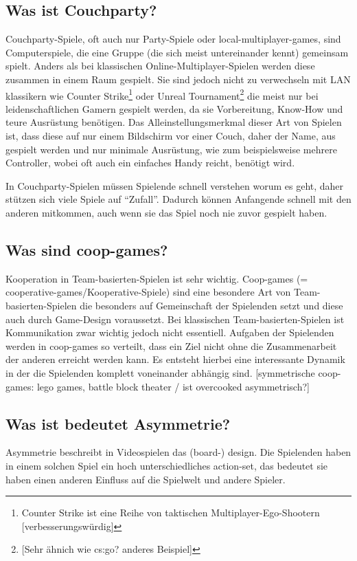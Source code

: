 \subsection{Was ist Couchparty?}

Couchparty-Spiele, oft auch nur Party-Spiele oder local-multiplayer-games, sind Computerspiele, die eine Gruppe (die sich meist untereinander kennt) gemeinsam spielt. Anders als bei klassischen Online-Multiplayer-Spielen werden diese zusammen in einem Raum gespielt. Sie sind jedoch nicht zu verwechseln mit LAN klassikern wie Counter Strike\footnote{Counter Strike ist eine Reihe von taktischen Multiplayer-Ego-Shootern [verbesserungswürdig]} oder Unreal Tournament\footnote{[Sehr ähnich wie cs:go? anderes Beispiel]} die meist nur bei leidenschaftlichen Gamern gespielt werden, da sie Vorbereitung, Know-How und teure Ausrüstung benötigen. Das Alleinstellungsmerkmal dieser Art von Spielen ist, dass diese auf nur einem Bildschirm vor einer Couch, daher der Name, aus gespielt werden und nur minimale Ausrüstung, wie zum beispielsweise mehrere Controller, wobei oft auch ein einfaches Handy reicht, benötigt wird.

In Couchparty-Spielen müssen Spielende schnell verstehen worum es geht, daher stützen sich viele Spiele auf "`Zufall"'. Dadurch können Anfangende schnell mit den anderen mitkommen, auch wenn sie das Spiel noch nie zuvor gespielt haben.

\subsection{Was sind coop-games?}

Kooperation in Team-basierten-Spielen ist sehr wichtig. Coop-games (= cooperative-games/Kooperative-Spiele) sind eine besondere Art von Team-basierten-Spielen die besonders auf Gemeinschaft der Spielenden setzt und diese auch durch Game-Design voraussetzt. Bei klassischen Team-basierten-Spielen ist Kommunikation zwar wichtig jedoch nicht essentiell. Aufgaben der Spielenden werden in coop-games so verteilt, dass ein Ziel nicht ohne die Zusammenarbeit der anderen erreicht werden kann. Es entsteht hierbei eine interessante Dynamik in der die Spielenden komplett voneinander abhängig sind. [symmetrische coop-games: lego games, battle block theater / ist overcooked asymmetrisch?]

\subsection{Was ist bedeutet Asymmetrie?}

Asymmetrie beschreibt in Videospielen das (board-) design. Die Spielenden haben in einem solchen Spiel ein hoch unterschiedliches action-set, das bedeutet sie haben einen anderen Einfluss auf die Spielwelt und andere Spieler.\cite{_balancing_asymmetric_video_games}